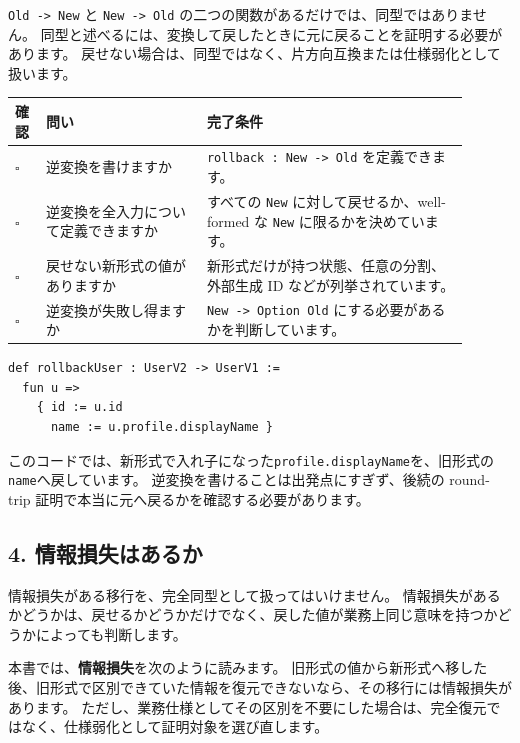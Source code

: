 \texttt{Old -> New} と \texttt{New -> Old} の二つの関数があるだけでは、同型ではありません。
同型と述べるには、変換して戻したときに元に戻ることを証明する必要があります。
戻せない場合は、同型ではなく、片方向互換または仕様弱化として扱います。

\begin{longtable}{@{}p{0.06\linewidth}p{0.32\linewidth}p{0.52\linewidth}@{}}
\toprule
確認 & 問い & 完了条件 \\
\midrule
\endhead
\(\square\) & 逆変換を書けますか & \texttt{rollback : New -> Old} を定義できます。 \\
\(\square\) & 逆変換を全入力について定義できますか & すべての \texttt{New} に対して戻せるか、well-formed な \texttt{New} に限るかを決めています。 \\
\(\square\) & 戻せない新形式の値がありますか & 新形式だけが持つ状態、任意の分割、外部生成 ID などが列挙されています。 \\
\(\square\) & 逆変換が失敗し得ますか & \texttt{New -> Option Old} にする必要があるかを判断しています。 \\
\bottomrule
\end{longtable}

\begin{listing}[htbp]
\begin{verbatim}
def rollbackUser : UserV2 -> UserV1 :=
  fun u =>
    { id := u.id
      name := u.profile.displayName }
\end{verbatim}
\caption{\texttt{rollbackUser}}
\label{lst:appD_rollback_function}
\end{listing}

このコードでは、新形式で入れ子になった\texttt{profile.displayName}を、旧形式の\texttt{name}へ戻しています。
逆変換を書けることは出発点にすぎず、後続の round-trip 証明で本当に元へ戻るかを確認する必要があります。

\subsection{4. 情報損失はあるか}

情報損失がある移行を、完全同型として扱ってはいけません。
情報損失があるかどうかは、戻せるかどうかだけでなく、戻した値が業務上同じ意味を持つかどうかによっても判断します。

本書では、\textbf{情報損失}を次のように読みます。
旧形式の値から新形式へ移した後、旧形式で区別できていた情報を復元できないなら、その移行には情報損失があります。
ただし、業務仕様としてその区別を不要にした場合は、完全復元ではなく、仕様弱化として証明対象を選び直します。

